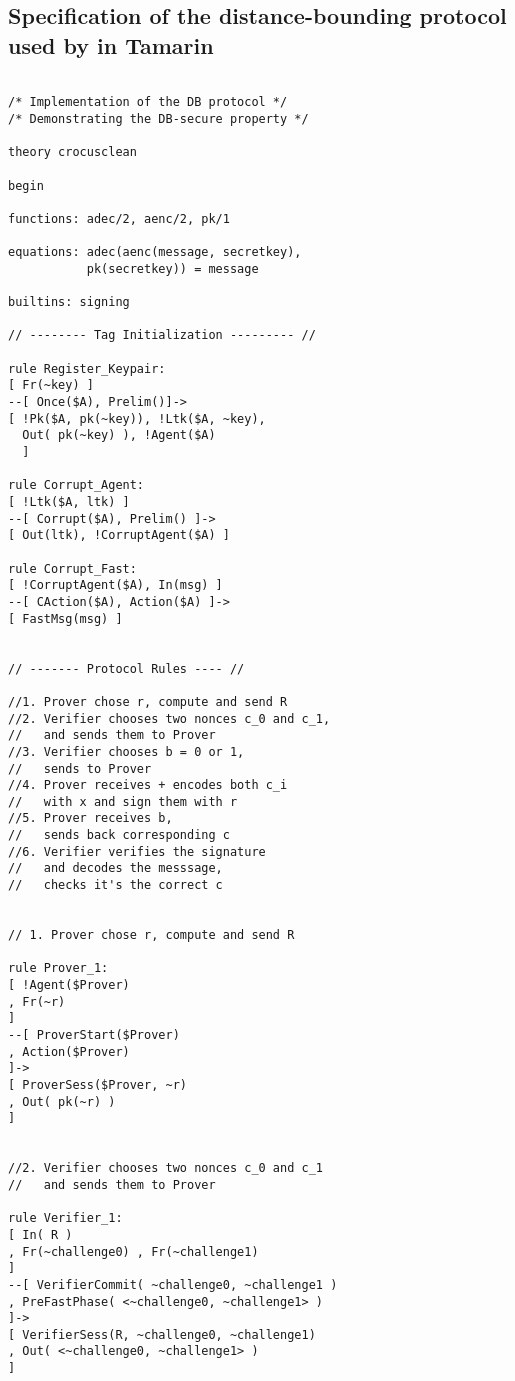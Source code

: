 \appendix

\subsection{Specification of the distance-bounding protocol used by \PRIVO in Tamarin}
\label{apdx:tamarin-spec}

\begin{lstlisting}

/* Implementation of the DB protocol */
/* Demonstrating the DB-secure property */

theory crocusclean

begin

functions: adec/2, aenc/2, pk/1

equations: adec(aenc(message, secretkey), 
           pk(secretkey)) = message

builtins: signing

// -------- Tag Initialization --------- //

rule Register_Keypair:
[ Fr(~key) ]
--[ Once($A), Prelim()]->
[ !Pk($A, pk(~key)), !Ltk($A, ~key), 
  Out( pk(~key) ), !Agent($A)
  ]

rule Corrupt_Agent:
[ !Ltk($A, ltk) ]
--[ Corrupt($A), Prelim() ]->
[ Out(ltk), !CorruptAgent($A) ]

rule Corrupt_Fast:
[ !CorruptAgent($A), In(msg) ]
--[ CAction($A), Action($A) ]->
[ FastMsg(msg) ]


// ------- Protocol Rules ---- //

//1. Prover chose r, compute and send R
//2. Verifier chooses two nonces c_0 and c_1,
//   and sends them to Prover
//3. Verifier chooses b = 0 or 1, 
//   sends to Prover
//4. Prover receives + encodes both c_i 
//   with x and sign them with r
//5. Prover receives b,
//   sends back corresponding c
//6. Verifier verifies the signature 
//   and decodes the messsage, 
//   checks it's the correct c


// 1. Prover chose r, compute and send R

rule Prover_1:
[ !Agent($Prover) 
, Fr(~r)
]
--[ ProverStart($Prover)
, Action($Prover)
]->
[ ProverSess($Prover, ~r) 
, Out( pk(~r) )
]


//2. Verifier chooses two nonces c_0 and c_1 
//   and sends them to Prover

rule Verifier_1:
[ In( R ) 
, Fr(~challenge0) , Fr(~challenge1)
]
--[ VerifierCommit( ~challenge0, ~challenge1 ) 
, PreFastPhase( <~challenge0, ~challenge1> )
]->
[ VerifierSess(R, ~challenge0, ~challenge1) 
, Out( <~challenge0, ~challenge1> )
]



\end{lstlisting}
